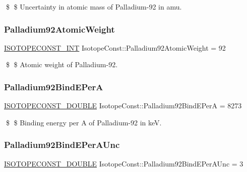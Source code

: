 \$ \$ Uncertainty in atomic mass of Palladium-\/92 in amu. \mbox{\label{group___isotope_const-_palladium-_pd92_gad573249eb4b7f3bcf07c618aeec49b7a}} 
\subsubsection{\texorpdfstring{Palladium92\+Atomic\+Weight}{Palladium92AtomicWeight}}
{\footnotesize\ttfamily \mbox{\hyperlink{group___isotope_const-_macros_ga5f18360b3e99483a35c32d789e62621c}{I\+S\+O\+T\+O\+P\+E\+C\+O\+N\+S\+T\+\_\+\+I\+NT}} Isotope\+Const\+::\+Palladium92\+Atomic\+Weight = 92}

\$ \$ Atomic weight of Palladium-\/92. \mbox{\label{group___isotope_const-_palladium-_pd92_ga4546a56847bc3cc40f51bff6c60da1a9}} 
\subsubsection{\texorpdfstring{Palladium92\+Bind\+E\+PerA}{Palladium92BindEPerA}}
{\footnotesize\ttfamily \mbox{\hyperlink{group___isotope_const-_macros_ga8f45a7272ce02c0b4c65c44636ed719a}{I\+S\+O\+T\+O\+P\+E\+C\+O\+N\+S\+T\+\_\+\+D\+O\+U\+B\+LE}} Isotope\+Const\+::\+Palladium92\+Bind\+E\+PerA = 8273}

\$ \$ Binding energy per A of Palladium-\/92 in keV. \mbox{\label{group___isotope_const-_palladium-_pd92_ga09e4afcbd3f72bc33212154136ceb006}} 
\subsubsection{\texorpdfstring{Palladium92\+Bind\+E\+Per\+A\+Unc}{Palladium92BindEPerAUnc}}
{\footnotesize\ttfamily \mbox{\hyperlink{group___isotope_const-_macros_ga8f45a7272ce02c0b4c65c44636ed719a}{I\+S\+O\+T\+O\+P\+E\+C\+O\+N\+S\+T\+\_\+\+D\+O\+U\+B\+LE}} Isotope\+Const\+::\+Palladium92\+Bind\+E\+Per\+A\+Unc = 3}

